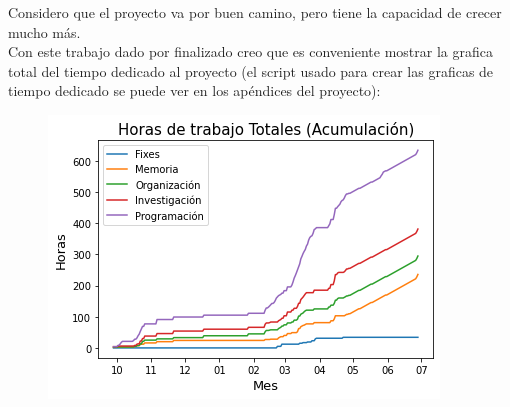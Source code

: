 \documentclass[12pt,a4paper]{article}
\begin{document}
	Considero que el proyecto va por buen camino, pero tiene la capacidad de crecer mucho más.\\
	Con este trabajo dado por finalizado creo que es conveniente mostrar la grafica total del tiempo dedicado al proyecto (el script usado para crear las graficas de tiempo dedicado se puede ver en los apéndices del proyecto):
	\begin{figure}[H]
\centering
  \centering
  \includegraphics[width=1\linewidth]{tiempo total}
\label{fig:subrgrafo}
\end{figure}
\pagebreak
	
\end{document}
